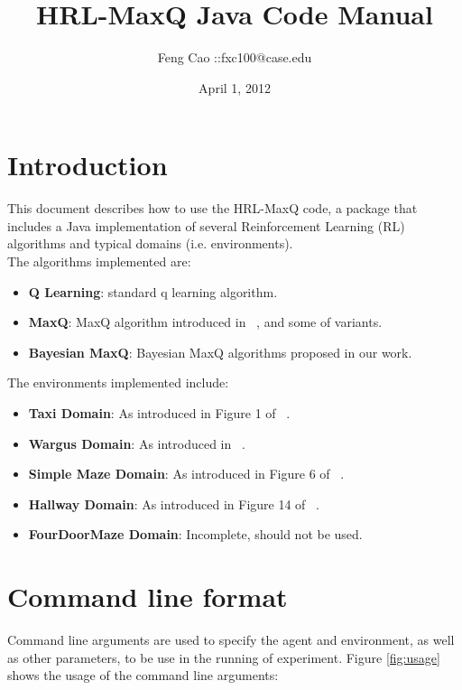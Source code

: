 \documentclass[11pt]{article} %
\title{HRL-MaxQ Java Code Manual}
\author{Feng Cao ::fxc100@case.edu}
\date{April 1, 2012} %
\begin{document}
\maketitle

\section{Introduction}
This document describes how to use the HRL-MaxQ code, a package that includes a Java implementation of several Reinforcement Learning (RL) algorithms and typical domains (i.e. environments). \\

The algorithms implemented are:
\begin{itemize}
\item {\bf Q Learning}: standard q learning algorithm. 
\item {\bf MaxQ}: MaxQ algorithm introduced in ~\cite{d-hrl-00}, and some of variants.
\item {\bf Bayesian MaxQ}: Bayesian MaxQ algorithms proposed in our work.
\end{itemize}

The environments implemented include:
\begin{itemize}
\item {\bf Taxi Domain}: As introduced in Figure 1 of ~\cite{d-hrl-00}.
\item {\bf Wargus Domain}: As introduced in ~\cite{mehta.icml08}. 
\item {\bf Simple Maze Domain}: As introduced in Figure 6 of ~\cite{d-hrl-00}.
\item {\bf Hallway Domain}: As introduced in Figure 14 of ~\cite{d-hrl-00}.
\item {\bf FourDoorMaze Domain}: Incomplete, should not be used. 
\end{itemize}

\section{Command line format}
Command line arguments are used to specify the agent and environment, as well as other parameters, to be use in the running of experiment. Figure \ref{fig:usage} shows the usage of the command line arguments:
\end{document}
